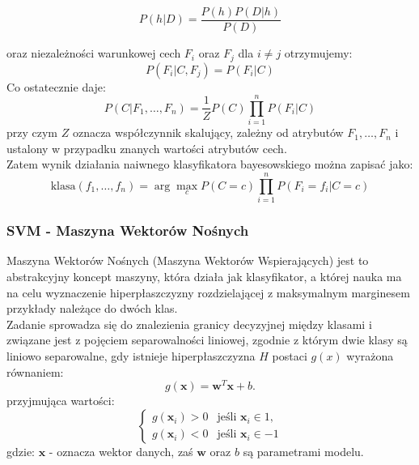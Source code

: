 \begin{equation}
    P(h|D) = \frac{P(h) P(D|h)}{P(D)}
\end{equation}

oraz niezależności warunkowej cech $F_i$ oraz $F_j$ dla $i \neq j$ otrzymujemy:
\begin{equation}
    P(F_i|C, F_j) = P(F_i|C)
\end{equation}
Co ostatecznie daje:\\

\begin{equation}
    P(C|F_1, \ldots, F_n) = \frac{1}{Z} P(C) \prod_{i=1}^n P(F_i|C)
\end{equation}
przy czym $Z$ oznacza współczynnik skalujący, zależny od atrybutów $F_1, \ldots, F_n$ i ustalony w przypadku znanych wartości atrybutów cech.\\
    
Zatem wynik działania naiwnego klasyfikatora bayesowskiego można zapisać jako:
\begin{equation}
    \text{klasa}(f_1, \ldots, f_n) = \arg\max_c P(C = c) \prod_{i=1}^n P(F_i = f_i | C = c)
\end{equation}

\subsubsection{SVM - Maszyna Wektorów Nośnych \cite{svm_wiki} \cite{wyklad}}
Maszyna Wektorów Nośnych (Maszyna Wektorów Wspierających) jest to abstrakcyjny koncept maszyny, która działa jak klasyfikator, a której nauka ma na celu wyznaczenie hiperpłaszczyzny rozdzielającej z maksymalnym marginesem przykłady należące do dwóch klas.\\

Zadanie sprowadza się do znalezienia granicy decyzyjnej między klasami i związane jest z pojęciem separowalności liniowej, zgodnie z którym dwie klasy są liniowo separowalne, gdy istnieje hiperpłaszczyzna $H$ postaci $g(x)$ wyrażona równaniem:
\begin{equation}
    g(\mathbf{x}) = \mathbf{w}^T \mathbf{x} + b.
\end{equation}
    przyjmująca wartości:
\begin{equation}
    \begin{cases}
    g(\mathbf{x}_i) > 0 & \text{jeśli } \mathbf{x}_i \in 1, \\
    g(\mathbf{x}_i) < 0 & \text{jeśli } \mathbf{x}_i \in -1
    \end{cases}
\end{equation}
    gdzie: $\mathbf{x}$ - oznacza wektor danych, zaś $\mathbf{w}$ oraz $b$ są parametrami modelu.\\

